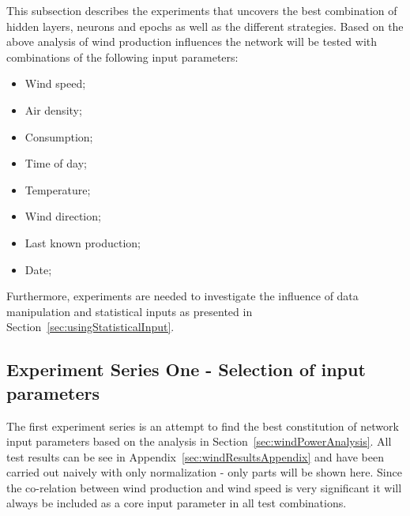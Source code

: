 This subsection describes the experiments that uncovers the best combination of hidden layers, neurons and epochs as well as the different strategies. Based on the above analysis of wind production influences the network will be tested with combinations of the following input parameters:

\begin{itemize}
\item Wind speed;
\item Air density;
\item Consumption;
\item Time of day;
\item Temperature;
\item Wind direction;
\item Last known production;
\item Date;
\end{itemize}

Furthermore, experiments are needed to investigate the influence of data manipulation and statistical inputs as presented in Section~\ref{sec:usingStatisticalInput}. 


\subsection{Experiment Series One - Selection of input parameters}
The first experiment series is an attempt to find the best constitution of network input parameters based on the analysis in Section~\ref{sec:windPowerAnalysis}. All test results can be see in Appendix~\ref{sec:windResultsAppendix} and have been carried out naively with only normalization - only parts will be shown here. Since the co-relation between wind production and wind speed is very significant it will always be included as a core input parameter in all test combinations.

